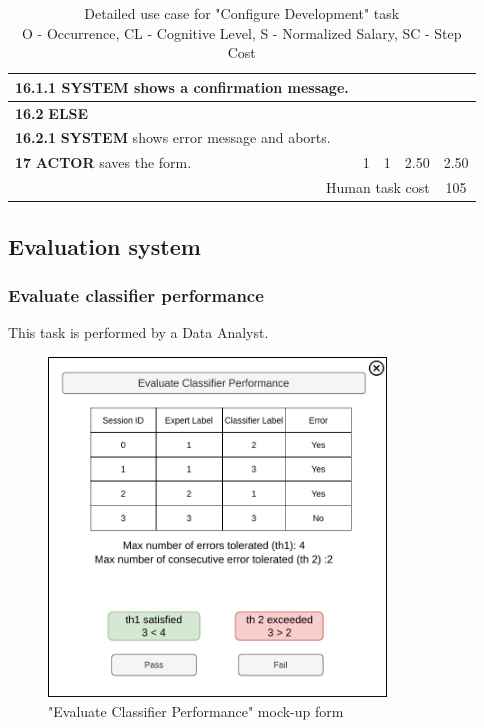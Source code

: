 \begin{table}[H]
\begin{tabularx}{\textwidth}{|X|c|c|c|c|}
    \hline
    \textbf{16.1.1} \textbf{SYSTEM} shows a confirmation message. & & & & \\
    \hline
    \textbf{16.2} \textbf{ELSE} & & & & \\
    \hline
    \textbf{16.2.1} \textbf{SYSTEM} shows error message and aborts. & & & & \\
    \hline
    \textbf{17} \textbf{ACTOR} saves the form. & 1 & 1 & 2.50 & 2.50 \\
    \hline
    \multicolumn{4}{|r|}{Human task cost} & 105 \\
    \hline
    \end{tabularx}
    \caption{Detailed use case for "Configure Development" task\\ 
    O - Occurrence, CL - Cognitive Level, S - Normalized Salary, SC - Step Cost}
    \label{table:configure_development_system}
    \end{table}
\subsection{Evaluation system}

\subsubsection{Evaluate classifier performance}

This task is performed by a Data Analyst.

\begin{figure}[H]
\centering
\includegraphics[width=0.8\textwidth]{figures/evaluate_classifier_performance.pdf}
\caption{"Evaluate Classifier Performance" mock-up form}
\end{figure}

